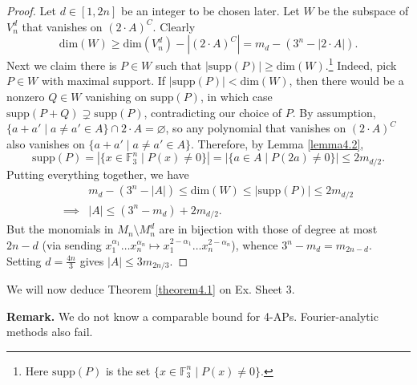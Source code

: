 \documentclass{article}
\theoremstyle{definition}
\begin{document}
\begin{proof}
    Let $d \in [1,2n]$ be an integer to be chosen later. Let $W$ be the subspace of $V_n^d$ that vanishes on $(2\cdot A)^C$. Clearly $$\text{dim}(W)\ge \text{dim}(V_n^d)-\left|(2\cdot A)^C\right| = m_d - (3^n - \left|2\cdot A\right|).$$ Next we claim there is $P \in W$ such that $\left|\text{supp}(P)\right|\ge \text{dim}(W)$.\footnote{Here $\text{supp}(P)$ is the set $\{x \in \mathbb{F}_3^n \mid P(x) \neq 0\}$.} Indeed, pick $P \in W$ with maximal support. If $\left|\text{supp}(P)\right|<\text{dim}(W)$, then there would be a nonzero $Q \in W$ vanishing on $\text{supp}(P)$, in which case $\text{supp}(P+Q) \supsetneq \text{supp}(P)$, contradicting our choice of $P$. By assumption, $\{a+a' \mid a \neq a' \in A\} \cap 2\cdot A = \varnothing$, so any polynomial that vanishes on $(2\cdot A)^C$ also vanishes on $\{a + a' \mid a \neq a' \in A\}$. Therefore, by Lemma \ref{lemma4.2}, $$\text{supp}(P) = \left|\{x \in \mathbb{F}_3^n \mid P(x)\neq 0\}\right| = \left|\{a \in A \mid P(2a) \neq 0\}\right|\le 2m_{d/2}.$$
    Putting everything together, we have
    \begin{align*}
        & m_d - (3^n - \left|A\right|)\le \text{dim}(W) \le \left|\text{supp}(P)\right| \le 2m_{d/2} \\
        \implies & \left|A\right|\le (3^n - m_d)+ 2 m_{d/2}.
    \end{align*}
    But the monomials in $M_n\setminus M_{n}^d  $ are in bijection with those of degree at most $2n-d$ (via sending $x_1^{\alpha_1}\ldots x_n^{\alpha_n} \mapsto x_1^{2-\alpha_1}\ldots x_n^{2-\alpha_n}$), whence $3^n - m_d = m_{2n-d}$. Setting $d = \frac{4n}{3}$ gives $\left|A\right|\le 3m_{2n/3}$.    
\end{proof}
We will now deduce Theorem \ref{theorem4.1} on Ex. Sheet 3.
\vspace{1mm}
 
\textbf{Remark.} We do not know a comparable bound for 4-APs. Fourier-analytic methods also fail.
\end{document}

